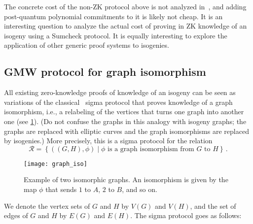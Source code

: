 \documentclass{llncs}
\newcommand{\Rela}{\mathcal{R}}
\begin{document}
The concrete cost of the non-ZK protocol above is not analyzed in~\cite{10.1007/978-3-030-99277-4_21}, and adding post-quantum polynomial commitments to it is likely not cheap.
It is an interesting question to analyze the actual cost of proving in ZK knowledge of an isogeny using a Sumcheck protocol.
It is equally interesting to explore the application of other generic proof systems to isogenies.


\subsection{GMW protocol for graph isomorphism \label{sec:GMW}}

All existing zero-knowledge proofs of knowledge of an isogeny can be seen as variations of the classical~\cite{GMW} sigma protocol that proves knowledge of a graph isomorphism, i.e., a relabeling of the vertices that turns one graph into another one (see \cref{fig:graph_iso}). 
(Do not confuse the graphs in this analogy with isogeny graphs; the graphs are replaced with elliptic curves and the graph isomorphisms are replaced by isogenies.)
More precisely, this is a sigma protocol for the relation \[
\Rela = \left \{ ((G,H),\phi) \mid \phi \text{ is a graph isomorphism from $G$ to $H$} \right \} \,.
\]




\begin{figure} \label{fig:graph_iso}
\centering
\texttt{[image: graph\_iso]}
\caption[Example of a graph isomorphism]{Example of two isomorphic graphs. An isomorphism is given by the map $\phi$ that sends $1$ to $A$, $2$ to $B$, and so on. } 
\end{figure}



We denote the vertex sets of $G$ and $H$ by $V(G)$ and $V(H)$, and the set of edges of $G$ and $H$ by $E(G)$ and $E(H)$. The sigma protocol goes as follows:
\end{document}
